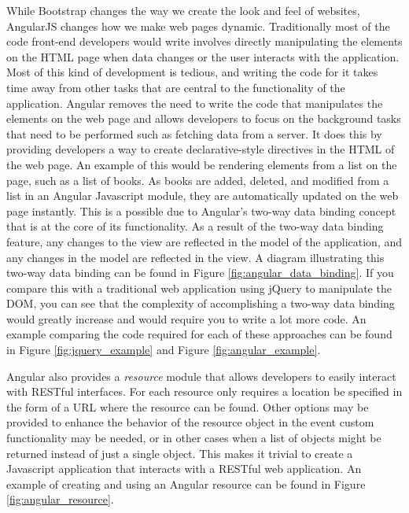 While Bootstrap changes the way we create the look and feel of websites, AngularJS changes how we make web pages dynamic. Traditionally most of the code front-end developers would write involves directly manipulating the elements on the HTML page when data changes or the user interacts with the application. Most of this kind of development is tedious, and writing the code for it takes time away from other tasks that are central to the functionality of the application. Angular removes the need to write the code that manipulates the elements on the web page and allows developers to focus on the background tasks that need to be performed such as fetching data from a server\cite{darwin2013angularjs}. It does this by providing developers a way to create declarative-style directives in the HTML of the web page. An example of this would be rendering elements from a list on the page, such as a list of books. As books are added, deleted, and modified from a list in an Angular Javascript module, they are automatically updated on the web page instantly. This is a possible due to Angular's two-way data binding concept that is at the core of its functionality. As a result of the two-way data binding feature, any changes to the view are reflected in the model of the application, and any changes in the model are reflected in the view. A diagram illustrating this two-way data binding can be found in Figure \ref{fig:angular_data_binding}\cite{angularconcepts2014}. If you compare this with a traditional web application using jQuery to manipulate the DOM, you can see that the complexity of accomplishing a two-way data binding would greatly increase and would require you to write a lot more code. An example comparing the code required for each of these approaches can be found in Figure \ref{fig:jquery_example} and Figure \ref{fig:angular_example}.

Angular also provides a \emph{resource} module that allows developers to easily interact with RESTful interfaces. For each resource only requires a location be specified in the form of a URL where the resource can be found. Other options may be provided to enhance the behavior of the resource object in the event custom functionality may be needed, or in other cases when a list of objects might be returned instead of just a single object. This makes it trivial to create a Javascript application that interacts with a RESTful web application. An example of creating and using an Angular resource can be found in Figure \ref{fig:angular_resource}.

